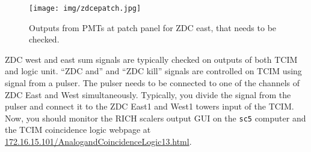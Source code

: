 \begin{figure}[htb]
\begin{center}
\texttt{[image: img/zdcepatch.jpg]}
\end{center}
\caption{Outputs from PMTs at patch panel for ZDC east, that needs to be checked.}
\label{zdcepatch}
\end{figure}

ZDC west and east sum signals are typically checked on outputs of both TCIM and logic unit. ``ZDC and'' and ``ZDC kill'' signals are controlled on TCIM using  signal from a pulser. The pulser needs to be connected to one of the channels of ZDC East and West simultaneously. Typically, you divide the signal from the pulser and connect it to the ZDC East1 and West1 towers input of the TCIM. Now, you should monitor the RICH scalers output GUI on the \texttt{sc5} computer and the TCIM coincidence logic webpage at \url{172.16.15.101/AnalogandCoincidenceLogic13.html}.
